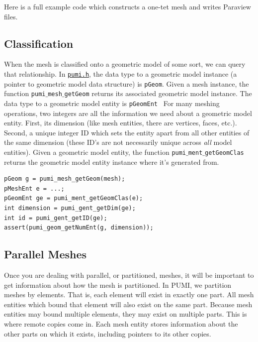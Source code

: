\documentclass{article}
\begin{document}
{Here is a full example code which constructs a one-tet
mesh and writes Paraview files.



\subsection{Classification}

When the mesh is classified onto a geometric model of some sort, we
can query that relationship. In \href{https://github.com/SCOREC/core/blob/master/pumi/pumi.h}{\texttt{pumi.h}}, the data type to a geometric model instance (a pointer to geometric model data structure) is \texttt{pGeom}. Given a mesh instance, the function \texttt{pumi$\_$mesh$\_$getGeom} returns its associated geometric model instance. The data type to a geometric model entity is {\texttt{pGeomEnt}}
\
For many meshing operations, two integers are all the information
we need about a geometric model entity.
First, its dimension (like mesh entities, there are vertices, faces, etc.).
Second, a unique integer ID which sets the entity apart from
all other entities of the same dimension (these ID's are not necessarily
unique across \emph{all} model entities).
Given a geometric model entity, the function \texttt{pumi$\_$ment$\_$getGeomClas} returns the geometric model entity instance where it's generated from.

\begin{lstlisting}
pGeom g = pumi_mesh_getGeom(mesh);
pMeshEnt e = ...;
pGeomEnt ge = pumi_ment_getGeomClas(e);
int dimension = pumi_gent_getDim(ge);
int id = pumi_gent_getID(ge);
assert(pumi_geom_getNumEnt(g, dimension));
\end{lstlisting}

\subsection{Parallel Meshes}

Once you are dealing with parallel, or partitioned, meshes,
it will be important to get information about how the
mesh is partitioned.
In PUMI, we partition meshes by elements.
That is, each element will exist in exactly one part.
All mesh entities which bound that element will also exist on
the same part.
Because mesh entities may bound multiple elements, they may
exist on multiple parts.
This is where remote copies come in.
Each mesh entity stores information about the other parts
on which it exists, including pointers to its other copies.

}
\end{document}
